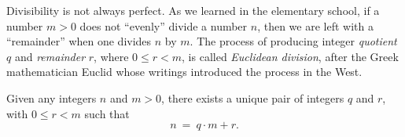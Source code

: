 Divisibility is not always perfect.  As we learned in the elementary
school, if a number $m > 0$ does not ``evenly'' divide a number $n$,
then we are left with a ``remainder'' when one divides $n$ by $m$.
The process of producing integer {\it quotient}  $q$
and {\it remainder}  $r$, where $0 \leq r < m$, is
called {\em Euclidean division},  after the
Greek mathematician Euclid whose writings introduced the process in
the West. 

\begin{prop}
\label{thm:division-thm}
Given any integers $n$ and $m > 0$, there exists a unique pair of
integers $q$ and $r$, with $0 \leq r < m$ such that
\begin{equation}
\label{eq:euclid-division}
n \ = \ q \cdot m + r.
\end{equation}
\end{prop}

